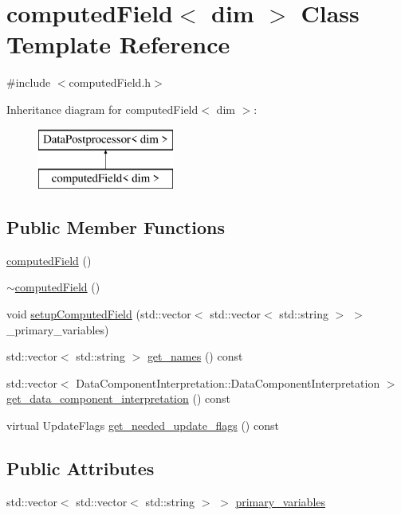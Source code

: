 \section{computed\+Field$<$ dim $>$ Class Template Reference}
\label{classcomputed_field}


{\ttfamily \#include $<$computed\+Field.\+h$>$}

Inheritance diagram for computed\+Field$<$ dim $>$\+:\begin{figure}[H]
\begin{center}
\leavevmode
\includegraphics[height=2.000000cm]{classcomputed_field}
\end{center}
\end{figure}
\subsection*{Public Member Functions}
\begin{DoxyCompactItemize}
\item 
\mbox{\hyperlink{classcomputed_field_ab4f4245d1d8abf1daeedbf2784d6c42a}{computed\+Field}} ()
\item 
\mbox{\hyperlink{classcomputed_field_a23cfaecc3df333ef21739f65a72c81ff}{$\sim$computed\+Field}} ()
\item 
void \mbox{\hyperlink{classcomputed_field_ac6ff6cde468abcaa2ee7c9c4fd6b9047}{setup\+Computed\+Field}} (std\+::vector$<$ std\+::vector$<$ std\+::string $>$ $>$ \+\_\+primary\+\_\+variables)
\item 
std\+::vector$<$ std\+::string $>$ \mbox{\hyperlink{classcomputed_field_a08e571d88aae15fdb3162f74bf9fd6e7}{get\+\_\+names}} () const
\item 
std\+::vector$<$ Data\+Component\+Interpretation\+::\+Data\+Component\+Interpretation $>$ \mbox{\hyperlink{classcomputed_field_a3a7ceb57bada784f078912268a0774a7}{get\+\_\+data\+\_\+component\+\_\+interpretation}} () const
\item 
virtual Update\+Flags \mbox{\hyperlink{classcomputed_field_ac3df6aa570f6a91215394fd4951e9f93}{get\+\_\+needed\+\_\+update\+\_\+flags}} () const
\end{DoxyCompactItemize}
\subsection*{Public Attributes}
\begin{DoxyCompactItemize}
\item 
std\+::vector$<$ std\+::vector$<$ std\+::string $>$ $>$ \mbox{\hyperlink{classcomputed_field_a4933860ad833b7b9bd2b8effee5c36d6}{primary\+\_\+variables}}
\end{DoxyCompactItemize}


